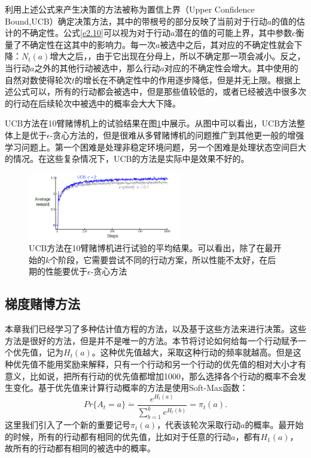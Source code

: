 \documentclass{ctexart}
\begin{document}
            利用上述公式来产生决策的方法被称为置信上界（Upper Confidence Bound,UCB）确定决策方法，其中的带根号的部分反映了当前对于行动$a$的值的估计的不确定性。公式\ref{e2.10}可以视为对于行动$a$潜在的值的可能上界，其中参数$c$衡量了不确定性在这其中的影响力。每一次$a$被选中之后，其对应的不确定性就会下降：$N_t(a)$增大之后，，由于它出现在分母上，所以不确定那一项会减小。反之，当行动$a$之外的其他行动被选中，那么行动$a$对应的不确定性会增大。其中使用的自然对数使得轮次$t$的增长在不确定性中的作用逐步降低，但是并无上限。根据上述公式可以，所有的行动都会被选中，但是那些值较低的，或者已经被选中很多次的行动在后续轮次中被选中的概率会大大下降。

            UCB方法在10臂赌博机上的试验结果在图\ref{f2_4}中展示。从图中可以看出，UCB方法整体上是优于$\epsilon$-贪心方法的，但是很难从多臂赌博机的问题推广到其他更一般的增强学习问题上。第一个困难是处理非稳定环境问题，另一个困难是处理状态空间巨大的情况。在这些复杂情况下，UCB的方法是实际中是效果不好的。
            \begin{figure}
                \centering
                \includegraphics[width=0.6\textwidth]{f2-4}
                \caption{UCB方法在10臂赌博机进行试验的平均结果。可以看出，除了在最开始的$k$个阶段，它需要尝试不同的行动方案，所以性能不太好，在后期的性能要优于$\epsilon$-贪心方法}
                \label{f2_4}
            \end{figure}

        \subsection{梯度赌博方法}
            本章我们已经学习了多种估计值方程的方法，以及基于这些方法来进行决策。这些方法是很好的方法，但是并不是唯一的方法。本节将讨论如何给每一个行动赋予一个优先值，记为$H_t(a)$。这种优先值越大，采取这种行动的频率就越高。但是这种优先值不能用奖励来解释，只有一个行动和另一个行动的优先值的相对大小才有意义，比如说，把所有行动的优先值都增加1000，那么选择各个行动的概率不会发生变化。基于优先值来计算行动概率的方法是使用Soft-Max函数：
            \begin{equation}
                Pr\{A_t = a\} \dot{=} \frac{e^{H_t(a)}}{\sum_{b=1}^k e^{H_t(b)}} = \pi_t(a).
                \label{e2.11}
            \end{equation}
            这里我们引入了一个新的重要记号$\pi_t(a)$，代表该轮次采取行动$a$的概率。最开始的时候，所有的行动都有相同的优先值，比如对于任意的行动$a$，都有$H_1(a)$，故所有的行动都有相同的被选中的概率。
\end{document}
